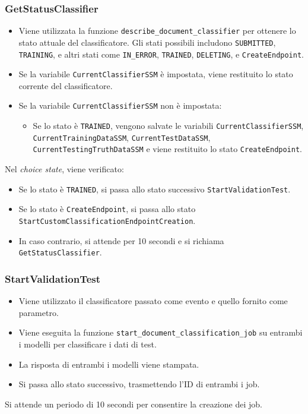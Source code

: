 \subsubsection{GetStatusClassifier}
\begin{itemize}
  \item Viene utilizzata la funzione \texttt{describe\_document\_classifier} per ottenere lo stato attuale del classificatore. Gli stati possibili includono \texttt{SUBMITTED}, \texttt{TRAINING}, e altri stati come \texttt{IN\_ERROR}, \texttt{TRAINED}, \texttt{DELETING}, e \texttt{CreateEndpoint}.
  \item Se la variabile \texttt{CurrentClassifierSSM} è impostata, viene restituito lo stato corrente del classificatore.
  \item Se la variabile \texttt{CurrentClassifierSSM} non è impostata:
  \begin{itemize}
    \item Se lo stato è \texttt{TRAINED}, vengono salvate le variabili \texttt{CurrentClassifierSSM}, \texttt{CurrentTrainingDataSSM}, \texttt{CurrentTestDataSSM}, \texttt{CurrentTestingTruthDataSSM} e viene restituito lo stato \texttt{CreateEndpoint}.
  \end{itemize}
\end{itemize}
Nel \textit{choice state}, viene verificato:
\begin{itemize}
  \item Se lo stato è \texttt{TRAINED}, si passa allo stato successivo \texttt{StartValidationTest}.
  \item Se lo stato è \texttt{CreateEndpoint}, si passa allo stato \texttt{StartCustomClassificationEndpointCreation}.
  \item In caso contrario, si attende per 10 secondi e si richiama \texttt{GetStatusClassifier}.
\end{itemize}

\subsubsection{StartValidationTest}
\begin{itemize}
  \item Viene utilizzato il classificatore passato come evento e quello fornito come parametro.
  \item Viene eseguita la funzione \texttt{start\_document\_classification\_job} su entrambi i modelli per classificare i dati di test.
  \item La risposta di entrambi i modelli viene stampata.
  \item Si passa allo stato successivo, trasmettendo l'ID di entrambi i job.
\end{itemize}
Si attende un periodo di 10 secondi per consentire la creazione dei job.

